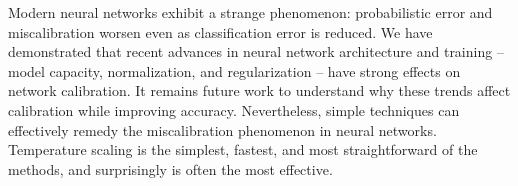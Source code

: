 

Modern neural networks exhibit a strange phenomenon: probabilistic error and miscalibration worsen even as classification error is reduced.
We have demonstrated that recent advances in neural network architecture and training -- model capacity, normalization, and regularization -- have strong effects on network calibration.
It remains future work to understand why these trends affect calibration while improving accuracy.
Nevertheless, simple techniques can effectively remedy the miscalibration phenomenon in neural networks.
Temperature scaling is the simplest, fastest, and most straightforward of the methods, and surprisingly is often the most effective.

